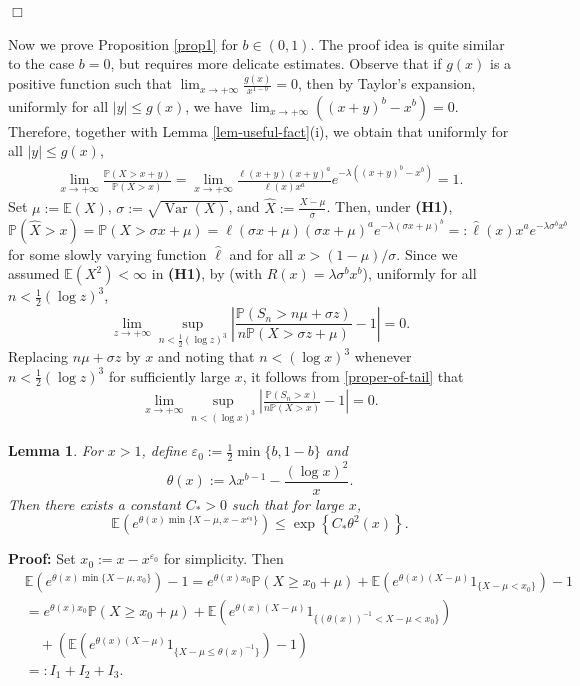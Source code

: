 \documentclass[10pt,a4paper]{amsart}
\newtheorem{lemma}[thrm]{Lemma}
\numberwithin{equation}{section}
\begin{document}
\hfill$\Box$



Now we prove Proposition \ref{prop1} for $b \in (0,1)$. The proof idea is quite similar to the case $b = 0$, but requires more delicate estimates. Observe that if $g(x)$ is a positive function such that $\lim_{x \to +\infty} \frac{g(x)}{x^{1-b}} = 0$, then by Taylor's expansion, uniformly for all $|y| \leq g(x)$, we have $\lim_{x \to +\infty} ((x+y)^b - x^b) = 0$. Therefore, together with Lemma \ref{lem-useful-fact}(i), we obtain that uniformly for all $|y| \leq g(x)$,
\begin{align}\label{proper-of-tail}
	\lim_{x \to +\infty} \frac{\mathbb{P}(X > x + y)}{\mathbb{P}(X > x)} = \lim_{x \to +\infty} \frac{\ell(x + y) (x + y)^a}{\ell(x) x^a} e^{-\lambda ((x+y)^b - x^b)} = 1.
\end{align}
Set $\mu := \mathbb{E}(X)$, $\sigma := \sqrt{\operatorname{Var}(X)}$, and $\widehat{X} := \frac{X - \mu}{\sigma}$. Then, under {\bf(H1)}, 
\[
\mathbb{P}(\widehat{X} > x) = \mathbb{P}(X > \sigma x + \mu) = \ell(\sigma x + \mu) (\sigma x + \mu)^a e^{-\lambda (\sigma x + \mu)^b} =: \widehat{\ell}(x) x^a e^{-\lambda \sigma^b x^b}
\]
for some slowly varying function $\widehat{\ell}$ and for all $x > (1 - \mu)/\sigma$. Since we assumed $\mathbb{E}(X^2) < \infty$ in {\bf(H1)}, by \cite[Theorem 8.3]{DDS2008} (with $R(x) = \lambda \sigma^b x^b$), uniformly for all $n < \frac{1}{2} (\log z)^3$,
\[
\lim_{z \to +\infty} \sup_{n<\frac{1}{2}(\log z)^3} \left| \frac{\mathbb{P}(S_n > n\mu + \sigma z)}{n \mathbb{P}(X > \sigma z + \mu)} -1\right|=0.
\]
Replacing $n\mu + \sigma z$ by $x$ and noting that $n < (\log x)^3$ whenever $n < \frac{1}{2} (\log z)^3$ for sufficiently large $x$, it follows from \eqref{proper-of-tail} that
\begin{align}\label{e6}
	\lim_{x \to +\infty} \sup_{n < (\log x)^3} \left| \frac{\mathbb{P}(S_n > x)}{n \mathbb{P}(X > x)} - 1 \right| = 0.
\end{align}
 
\begin{lemma}\label{lem2}
	For $x>1$, define $\varepsilon_0:= \frac{1}{2}\min\{ b, 1-b\}$ and
	\[
	\theta(x):= \lambda x^{b-1}-\frac{(\log x)^2}{x}.
	\]
	 Then there exists a constant $C_*>0$ such that for large $x$,
	 \[
	 \mathbb{E}\left(e^{ \theta(x) \min\{ X-\mu, x-x^{\varepsilon_0} \} }\right)  \leq \exp\left\{C_* \theta^2(x)\right\}.
	 \]
\end{lemma}
\textbf{Proof: }  Set $x_0:=x-x^{\varepsilon_0}$ for simplicity. Then 
\begin{align}
	 & \mathbb{E}\left( e^{ \theta(x) \min\{ X-\mu, x_0 \} }\right) -1 = e^{\theta(x)x_0}\mathbb{P}(X\geq x_0+\mu)+\mathbb{E}\left(e^{\theta(x)(X-\mu)}1_{\{X-\mu <x_0\}}\right)-1\nonumber\\
	 & = e^{\theta(x)x_0}\mathbb{P}(X\geq x_0+\mu)+ \mathbb{E}\left(e^{\theta(x)(X-\mu)}1_{\{(\theta(x))^{-1}< X-\mu <x_0\}}\right)\nonumber\\
	 &\quad +\left(\mathbb{E}\left(e^{\theta(x)(X-\mu)}1_{\{X-\mu \leq \theta(x)^{-1}\}}\right)-1\right)\nonumber\\
	 &=:  I_1+I_2+I_3.
\end{align}
\end{document}

